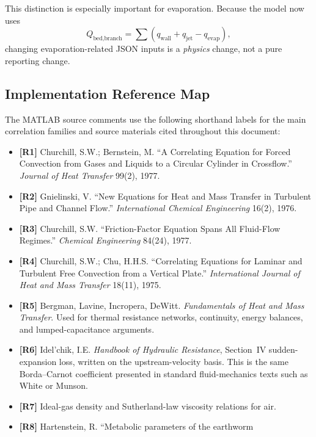 \documentclass{article}
\begin{document}
This distinction is especially important for evaporation. Because the model
now uses
\begin{equation}
Q_{\text{bed,branch}}
=
\sum\left(q_{\text{wall}}+q_{\text{jet}}-q_{\text{evap}}\right),
\end{equation}
changing evaporation-related JSON inputs is a \emph{physics} change, not a
pure reporting change.

\subsection{Implementation Reference Map}

The MATLAB source comments use the following shorthand labels for the main
correlation families and source materials cited throughout this document:
\begin{itemize}
\item \textbf{[R1]} Churchill, S.W.; Bernstein, M. ``A Correlating Equation
      for Forced Convection from Gases and Liquids to a Circular Cylinder in
      Crossflow.'' \emph{Journal of Heat Transfer} 99(2), 1977.
\item \textbf{[R2]} Gnielinski, V. ``New Equations for Heat and Mass Transfer
      in Turbulent Pipe and Channel Flow.'' \emph{International Chemical
      Engineering} 16(2), 1976.
\item \textbf{[R3]} Churchill, S.W. ``Friction-Factor Equation Spans All
      Fluid-Flow Regimes.'' \emph{Chemical Engineering} 84(24), 1977.
\item \textbf{[R4]} Churchill, S.W.; Chu, H.H.S. ``Correlating Equations for
      Laminar and Turbulent Free Convection from a Vertical Plate.''
      \emph{International Journal of Heat and Mass Transfer} 18(11), 1975.
\item \textbf{[R5]} Bergman, Lavine, Incropera, DeWitt.
      \emph{Fundamentals of Heat and Mass Transfer}. Used for thermal
      resistance networks, continuity, energy balances, and lumped-capacitance
      arguments.
\item \textbf{[R6]} Idel'chik, I.E. \emph{Handbook of Hydraulic Resistance},
      Section~IV sudden-expansion loss, written on the upstream-velocity
      basis. This is the same Borda--Carnot coefficient presented in
      standard fluid-mechanics texts such as White or Munson.
\item \textbf{[R7]} Ideal-gas density and Sutherland-law viscosity relations
      for air.
\item \textbf{[R8]} Hartenstein, R. ``Metabolic parameters of the earthworm

\end{itemize}
\end{document}
